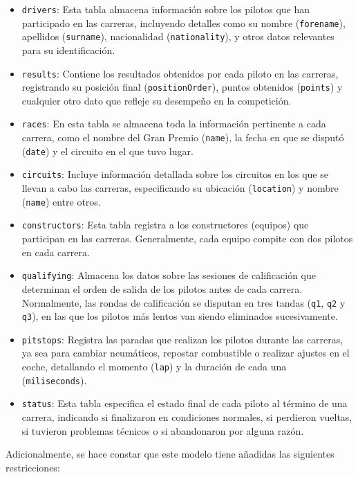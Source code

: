 \documentclass{db-practice}
\begin{document}
\begin{itemize}
    \item \texttt{drivers}: Esta tabla almacena información sobre los pilotos que han participado en las carreras, incluyendo detalles como su nombre (\texttt{forename}), apellidos (\texttt{surname}), nacionalidad (\texttt{nationality}), y otros datos relevantes para su identificación.
    \item \texttt{results}: Contiene los resultados obtenidos por cada piloto en las carreras, registrando su posición final (\texttt{positionOrder}), puntos obtenidos (\texttt{points}) y cualquier otro dato que refleje su desempeño en la competición.
    \item \texttt{races}: En esta tabla se almacena toda la información pertinente a cada carrera, como el nombre del Gran Premio (\texttt{name}), la fecha en que se disputó (\texttt{date}) y el circuito en el que tuvo lugar.
    \item \texttt{circuits}: Incluye información detallada sobre los circuitos en los que se llevan a cabo las carreras, especificando su ubicación (\texttt{location}) y nombre (\texttt{name}) entre otros.
    \item \texttt{constructors}: Esta tabla registra a los constructores (equipos) que participan en las carreras. Generalmente, cada equipo compite con dos pilotos en cada carrera.
    \item \texttt{qualifying}: Almacena los datos sobre las sesiones de calificación que determinan el orden de salida de los pilotos antes de cada carrera. Normalmente, las rondas de calificación se disputan en tres tandas (\texttt{q1}, \texttt{q2} y \texttt{q3}), en las que los pilotos más lentos van siendo eliminados sucesivamente.
    \item \texttt{pitstops}: Registra las paradas que realizan los pilotos durante las carreras, ya sea para cambiar neumáticos, repostar combustible o realizar ajustes en el coche, detallando el momento  (\texttt{lap}) y la duración de cada una (\texttt{miliseconds}).
    \item \texttt{status}: Esta tabla especifica el estado final de cada piloto al término de una carrera, indicando si finalizaron en condiciones normales, si perdieron vueltas, si tuvieron problemas técnicos o si abandonaron por alguna razón.
\end{itemize}

Adicionalmente, se hace constar que este modelo tiene añadidas las siguientes restricciones:
\end{document}
